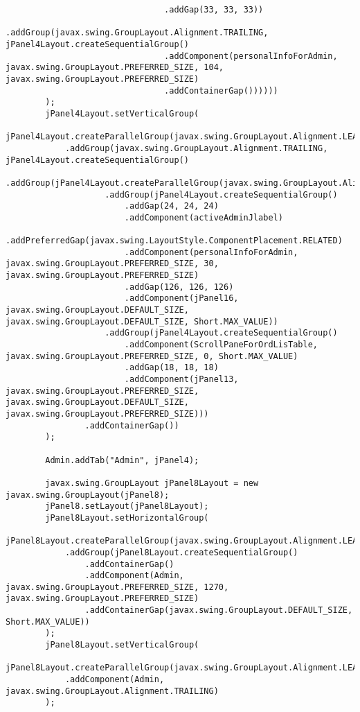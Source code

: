 \documentclass[12pt,a4paper]{article}
\begin{document}
\begin{lstlisting}
                                .addGap(33, 33, 33))
                            .addGroup(javax.swing.GroupLayout.Alignment.TRAILING, jPanel4Layout.createSequentialGroup()
                                .addComponent(personalInfoForAdmin, javax.swing.GroupLayout.PREFERRED_SIZE, 104, javax.swing.GroupLayout.PREFERRED_SIZE)
                                .addContainerGap())))))
        );
        jPanel4Layout.setVerticalGroup(
            jPanel4Layout.createParallelGroup(javax.swing.GroupLayout.Alignment.LEADING)
            .addGroup(javax.swing.GroupLayout.Alignment.TRAILING, jPanel4Layout.createSequentialGroup()
                .addGroup(jPanel4Layout.createParallelGroup(javax.swing.GroupLayout.Alignment.TRAILING)
                    .addGroup(jPanel4Layout.createSequentialGroup()
                        .addGap(24, 24, 24)
                        .addComponent(activeAdminJlabel)
                        .addPreferredGap(javax.swing.LayoutStyle.ComponentPlacement.RELATED)
                        .addComponent(personalInfoForAdmin, javax.swing.GroupLayout.PREFERRED_SIZE, 30, javax.swing.GroupLayout.PREFERRED_SIZE)
                        .addGap(126, 126, 126)
                        .addComponent(jPanel16, javax.swing.GroupLayout.DEFAULT_SIZE, javax.swing.GroupLayout.DEFAULT_SIZE, Short.MAX_VALUE))
                    .addGroup(jPanel4Layout.createSequentialGroup()
                        .addComponent(ScrollPaneForOrdLisTable, javax.swing.GroupLayout.PREFERRED_SIZE, 0, Short.MAX_VALUE)
                        .addGap(18, 18, 18)
                        .addComponent(jPanel13, javax.swing.GroupLayout.PREFERRED_SIZE, javax.swing.GroupLayout.DEFAULT_SIZE, javax.swing.GroupLayout.PREFERRED_SIZE)))
                .addContainerGap())
        );

        Admin.addTab("Admin", jPanel4);

        javax.swing.GroupLayout jPanel8Layout = new javax.swing.GroupLayout(jPanel8);
        jPanel8.setLayout(jPanel8Layout);
        jPanel8Layout.setHorizontalGroup(
            jPanel8Layout.createParallelGroup(javax.swing.GroupLayout.Alignment.LEADING)
            .addGroup(jPanel8Layout.createSequentialGroup()
                .addContainerGap()
                .addComponent(Admin, javax.swing.GroupLayout.PREFERRED_SIZE, 1270, javax.swing.GroupLayout.PREFERRED_SIZE)
                .addContainerGap(javax.swing.GroupLayout.DEFAULT_SIZE, Short.MAX_VALUE))
        );
        jPanel8Layout.setVerticalGroup(
            jPanel8Layout.createParallelGroup(javax.swing.GroupLayout.Alignment.LEADING)
            .addComponent(Admin, javax.swing.GroupLayout.Alignment.TRAILING)
        );


\end{lstlisting}
\end{document}
